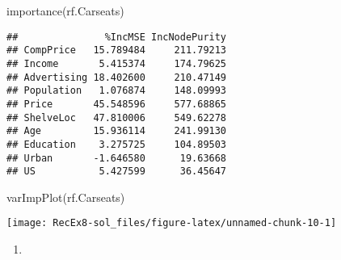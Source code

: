 \documentclass[
]{article}
\newenvironment{Shaded}{\begin{snugshade}}{\end{snugshade}}
\newcommand{\AttributeTok}[1]{\textcolor[rgb]{0.77,0.63,0.00}{#1}}
\newcommand{\DecValTok}[1]{\textcolor[rgb]{0.00,0.00,0.81}{#1}}
\newcommand{\FloatTok}[1]{\textcolor[rgb]{0.00,0.00,0.81}{#1}}
\newcommand{\FunctionTok}[1]{\textcolor[rgb]{0.00,0.00,0.00}{#1}}
\newcommand{\NormalTok}[1]{#1}
\newcommand{\OtherTok}[1]{\textcolor[rgb]{0.56,0.35,0.01}{#1}}
\newcommand{\SpecialCharTok}[1]{\textcolor[rgb]{0.00,0.00,0.00}{#1}}
\newcommand{\StringTok}[1]{\textcolor[rgb]{0.31,0.60,0.02}{#1}}
\providecommand{\tightlist}{%
  \setlength{\itemsep}{0pt}\setlength{\parskip}{0pt}}
\begin{document}
\begin{Shaded}
\begin{Highlighting}[]
\FunctionTok{importance}\NormalTok{(rf.Carseats)}
\end{Highlighting}
\end{Shaded}

\begin{verbatim}
##               %IncMSE IncNodePurity
## CompPrice   15.789484     211.79213
## Income       5.415374     174.79625
## Advertising 18.402600     210.47149
## Population   1.076874     148.09993
## Price       45.548596     577.68865
## ShelveLoc   47.810006     549.62278
## Age         15.936114     241.99130
## Education    3.275725     104.89503
## Urban       -1.646580      19.63668
## US           5.427599      36.45647
\end{verbatim}

\begin{Shaded}
\begin{Highlighting}[]
\FunctionTok{varImpPlot}\NormalTok{(rf.Carseats)}
\end{Highlighting}
\end{Shaded}

\texttt{[image: RecEx8-sol\_files/figure-latex/unnamed-chunk-10-1]}

\begin{enumerate}
\def\labelenumi{\alph{enumi})}
\setcounter{enumi}{5}
\tightlist
\item
\end{enumerate}

\begin{Shaded}
\end{Shaded}
\end{document}

